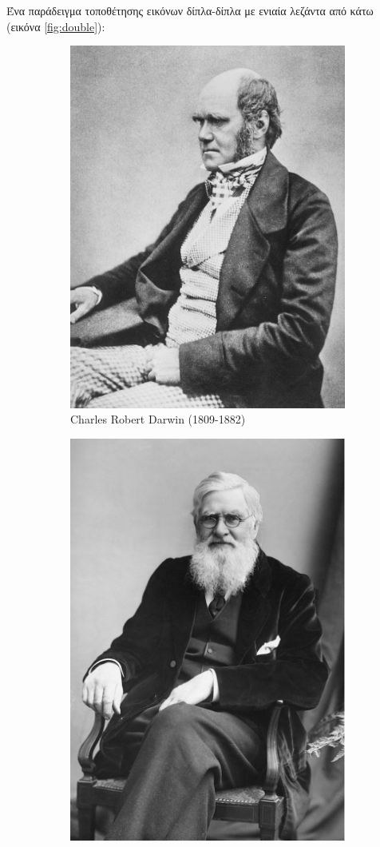\begin{refsection}
Ένα παράδειγμα τοποθέτησης εικόνων δίπλα-δίπλα με ενιαία λεζάντα από κάτω (εικόνα \ref{fig:double}):
\begin{figure}
\renewcommand{\figurename}{Εικόνα}
\centering
\begin{subfigure}{.5\textwidth}
  \centering
  \includegraphics[width=.7\linewidth]{images/darwin.pdf}
  \caption{Charles Robert Darwin (1809-1882)}
  \label{fig:sub1}
\end{subfigure}%
\begin{subfigure}{.5\textwidth}
  \centering
  \includegraphics[width=.63\linewidth]{images/wallace.pdf}

\end{subfigure}
\end{figure}
\end{refsection}
